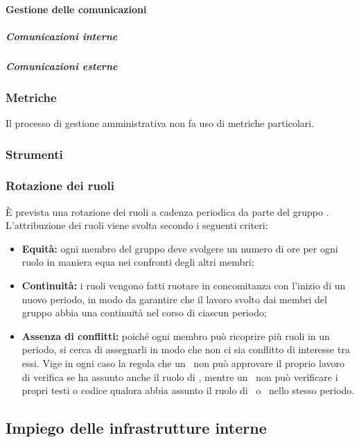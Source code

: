   \paragraph{Gestione delle comunicazioni}
  \subparagraph{Comunicazioni interne}

  \subparagraph{Comunicazioni esterne}
  \subsubsection{Metriche}
  Il processo di gestione amministrativa non fa uso di metriche particolari.
  \subsubsection{Strumenti}
      \subsubsection{Rotazione dei ruoli}
      È prevista una rotazione dei ruoli a cadenza periodica da parte del gruppo \groupName.\\
      L'attribuzione dei ruoli viene svolta secondo i seguenti criteri:
      \begin{itemize}
        \item \textbf{Equità:} ogni membro del gruppo deve svolgere un numero di ore per ogni ruolo in maniera equa nei confronti degli altri membri;
        \item \textbf{Continuità:} i ruoli vengono fatti ruotare in concomitanza con l'inizio di un nuovo periodo, in modo da garantire che il lavoro svolto dai membri del gruppo abbia una continuità nel corso di ciascun periodo;
        \item \textbf{Assenza di conflitti:} poiché ogni membro può ricoprire più ruoli in un periodo, si cerca di assegnarli in modo che non ci sia conflitto di interesse tra essi. Vige in ogni caso la regola che un \roleProjectManagerLow\ non può approvare il proprio lavoro di verifica se ha assunto anche il ruolo di \roleVerifierLow, mentre un \roleVerifierLow\ non può verificare i propri testi o codice qualora abbia assunto il ruolo di \roleAnalystLow\ o \roleProgrammerLow\ nello stesso periodo.
      \end{itemize}


  \subsection{Impiego delle infrastrutture interne} \label{subsection:infrastrutture_interne}


